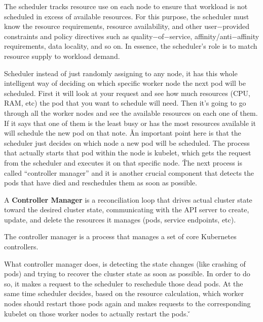 The scheduler tracks resource use on each node to ensure that workload is not scheduled in excess of available
resources. For this purpose, the scheduler must know the resource requirements, resource availability, and other
user$-$provided constraints and policy directives such as quality$-$of$-$service, affinity/anti$-$affinity
requirements, data locality, and so on. In essence, the scheduler's role is to match resource supply to workload demand.


Scheduler instead of just randomly assigning to any node, it has this whole intelligent way of deciding on which
specific worker node the next pod will be scheduled. First it will look at your request and see how much resources
(CPU, RAM, etc) the pod that you want to schedule will need. Then it's going to go through all the worker nodes and
see the available resources on each one of them. If it says that one of them is the least busy or has the most
resources available it will schedule the new pod on that note. \v

An important point here is that the scheduler just decides on which node a new pod will be scheduled. The process
that actually starts that pod within the node is kubelet, which gets the request from the scheduler and executes it
on that specific node. \v

The next process is called ``controller manager'' and it is another crucial component that detects the pods that have
died and reschedules them as soon as possible.

A \textbf{Controller Manager} is a reconciliation loop that drives actual cluster state toward the desired cluster
state, communicating with the API server to create, update, and delete the resources it manages (pods, service
endpoints, etc).
\ed

The controller manager is a process that manages a set of core Kubernetes controllers.


What controller manager does, is detecting the state changes (like crashing of pods) and trying to recover the
cluster state as soon as possible. In order to do so, it makes a request to the scheduler to reschedule those dead
pods. At the same time scheduler decides, based on the resource calculation, which worker nodes should restart those
pods again and makes requests to the corresponding kubelet on those worker nodes to actually restart the pods. \v


